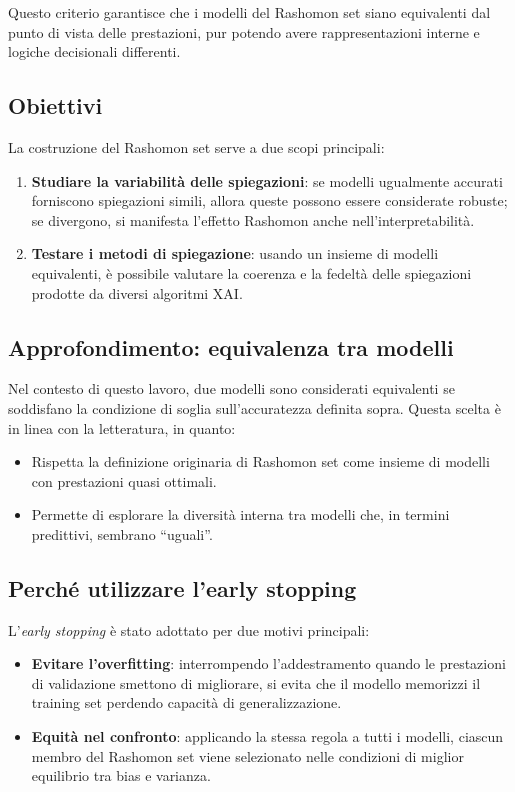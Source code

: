 \documentclass{article}
\begin{document}
Questo criterio garantisce che i modelli del Rashomon set siano equivalenti dal
punto di vista delle prestazioni, pur potendo avere rappresentazioni interne e
logiche decisionali differenti.

\subsection{Obiettivi}
La costruzione del Rashomon set serve a due scopi principali:
\begin{enumerate}
      \item \textbf{Studiare la variabilità delle spiegazioni}: se modelli ugualmente accurati forniscono spiegazioni simili, allora queste possono essere considerate robuste; se divergono, si manifesta l’effetto Rashomon anche nell’interpretabilità.
      \item \textbf{Testare i metodi di spiegazione}: usando un insieme di modelli equivalenti, è possibile valutare la coerenza e la fedeltà delle spiegazioni prodotte da diversi algoritmi XAI.
\end{enumerate}

\subsection{Approfondimento: equivalenza tra modelli}
Nel contesto di questo lavoro, due modelli sono considerati equivalenti se
soddisfano la condizione di soglia sull’accuratezza definita sopra. Questa
scelta è in linea con la letteratura, in quanto:
\begin{itemize}
      \item Rispetta la definizione originaria di Rashomon set come insieme di modelli con
            prestazioni quasi ottimali.
      \item Permette di esplorare la diversità interna tra modelli che, in termini
            predittivi, sembrano “uguali”.
\end{itemize}

\subsection{Perché utilizzare l’early stopping}
L’\emph{early stopping} è stato adottato per due motivi principali:
\begin{itemize}
      \item \textbf{Evitare l’overfitting}: interrompendo l’addestramento quando le prestazioni di validazione smettono di migliorare, si evita che il modello memorizzi il training set perdendo capacità di generalizzazione.
      \item \textbf{Equità nel confronto}: applicando la stessa regola a tutti i modelli, ciascun membro del Rashomon set viene selezionato nelle condizioni di miglior equilibrio tra bias e varianza.
\end{itemize}
\end{document}
